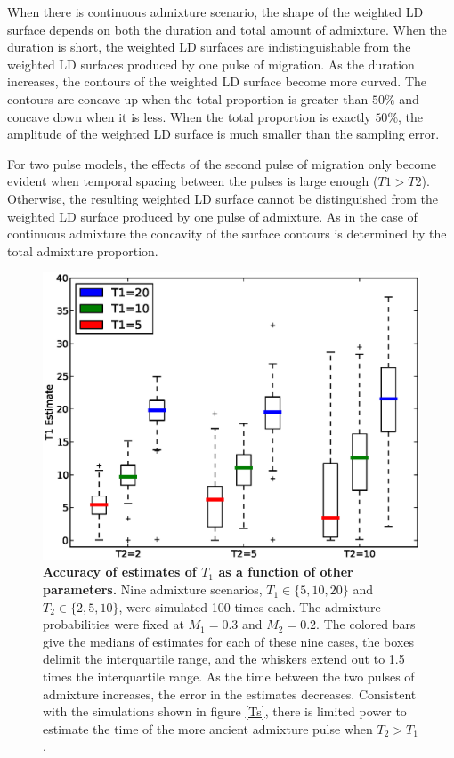 When there is continuous admixture scenario, the shape of the weighted LD surface depends on both the duration and total amount of admixture. When the duration is short, the weighted LD surfaces are indistinguishable from the weighted LD surfaces produced by one pulse of migration. As the duration increases, the contours of the weighted LD surface become more curved. The contours are concave up when the total proportion is greater than $50\%$ and concave down when it is less. When the total proportion is exactly $50\%$, the amplitude of the weighted LD surface is much smaller than the sampling error.

For two pulse models, the effects of the second pulse of migration only become evident when temporal spacing between the pulses is large enough ($T1 > T2$). Otherwise, the resulting weighted LD surface cannot be distinguished from the weighted LD surface produced by one pulse of admixture. As in the case of continuous admixture the concavity of the surface contours is determined by the total admixture proportion. 

\begin{figure}
\includegraphics[scale=.6]{estimates.eps}
\caption{
{\bf Accuracy of estimates of $T_1$ as a function of other parameters.} Nine admixture scenarios, $T_1\in \{5,10,20\}$ and $T_2\in\{2,5,10\}$, were simulated 100 times each. The admixture probabilities were fixed at $M_1=0.3$ and $M_2=0.2$. The colored bars give the medians of estimates for each of these nine cases, the boxes delimit the interquartile range, and the whiskers extend out to 1.5 times the interquartile range. As the time between the two pulses of admixture increases, the error in the estimates decreases. Consistent with the simulations shown in figure \ref{Ts}, there is limited power to estimate the time of the more ancient admixture pulse when $T_2>T_1$.
}
\label{estimates}
\end{figure}

